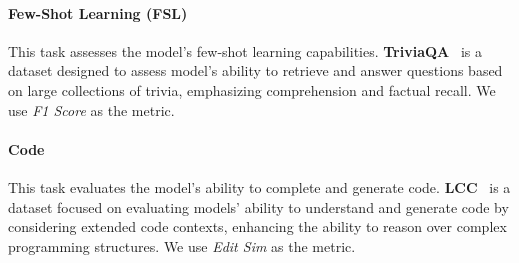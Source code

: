 \paragraph{Few-Shot Learning (FSL)} This task assesses the model's few-shot learning capabilities. \textbf{TriviaQA}~\cite{DBLP:conf/acl/JoshiCWZ17} is a dataset designed to assess model's ability to retrieve and answer questions based on large collections of trivia, emphasizing comprehension and factual recall. We use \textit{F1 Score} as the metric.

\paragraph{Code} This task evaluates the model's ability to complete and generate code. \textbf{LCC}~\cite{DBLP:conf/icml/GuoXD0M23} is a dataset focused on evaluating models' ability to understand and generate code by considering extended code contexts, enhancing the ability to reason over complex programming structures. We use \textit{Edit Sim} as the metric.